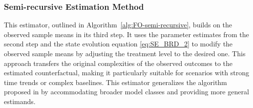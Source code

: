 \subsubsection{Semi-recursive Estimation Method}
\label{apndx:semi-recursive_estimators}
% 
This estimator, outlined in Algorithm~\ref{alg:FO-semi-recursive}, builds on the observed sample means in its third step. It uses the parameter estimates from the second step and the state evolution equation \eqref{eq:SE_BRD_2} to modify the observed sample means by adjusting the treatment level to the desired one. This approach transfers the original complexities of the observed outcomes to the estimated counterfactual, making it particularly suitable for scenarios with strong time trends or complex baselines. This estimator generalizes the algorithm proposed in \cite{shirani2024causal} by accommodating broader model classes and providing more general estimands.

